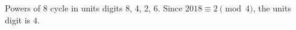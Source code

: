 Powers of 8 cycle in units digits 8, 4, 2, 6. Since $2018\equiv2\pmod4$, the units digit is $\boxed4$.
